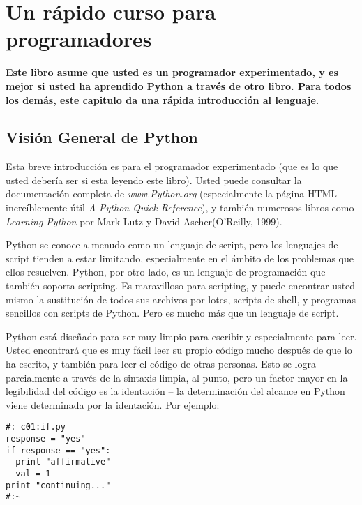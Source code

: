 \section*{Un rápido curso para programadores}
\label{sec:urcpp}


\textbf{Este libro asume que usted es un programador experimentado, y es mejor si usted ha aprendido Python a través de otro libro. Para todos los demás, este capitulo da una rápida introducción al lenguaje.}

\subsection*{Visión General de Python}
\label{subsec:vgpy}

Esta breve introducción es para el programador experimentado (que es lo que usted debería ser si esta leyendo este libro). Usted puede consultar la documentación completa de \textit{www.Python.org} (especialmente la página HTML increíblemente útil \textit{A Python Quick Reference}), y también numerosos libros como \textit{Learning Python} por Mark Lutz y David Ascher(O'Reilly, 1999). \newline

Python se conoce a menudo como un lenguaje de script, pero los lenguajes de script tienden a estar limitando, especialmente en el ámbito de los problemas que ellos resuelven. Python, por otro lado, es un lenguaje de  programación que también soporta scripting. Es maravilloso para scripting, y puede encontrar usted mismo la sustitución de todos sus archivos por lotes, scripts de shell, y programas sencillos con scripts de Python. Pero es mucho más que un lenguaje de script.  \newline

Python está diseñado para ser muy limpio para escribir y especialmente para leer. Usted encontrará que es muy fácil leer su propio código mucho después de que lo ha escrito, y también para leer el código de otras personas. Esto se logra parcialmente a través de la sintaxis limpia, al punto, pero un factor mayor en la legibilidad del código es la identación – la determinación del alcance en Python viene determinada por la identación. Por ejemplo: \newline

\begin{lstlisting} 
#: c01:if.py
response = "yes" 
if response == "yes": 
  print "affirmative" 
  val = 1 
print "continuing..." 
#:~ 
\end{lstlisting}

